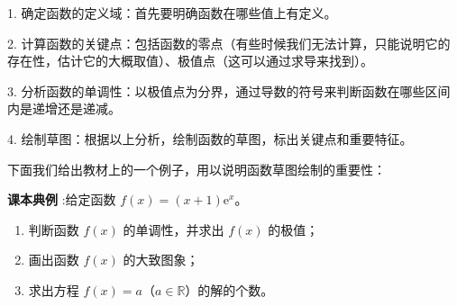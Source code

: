 \documentclass{article}
\begin{document}
1. 确定函数的定义域：首先要明确函数在哪些值上有定义。

2. 计算函数的关键点：包括函数的零点（有些时候我们无法计算，只能说明它的存在性，估计它的大概取值）、极值点（这可以通过求导来找到）。

3. 分析函数的单调性：以极值点为分界，通过导数的符号来判断函数在哪些区间内是递增还是递减。

4. 绘制草图：根据以上分析，绘制函数的草图，标出关键点和重要特征。

下面我们给出教材上的一个例子，用以说明函数草图绘制的重要性：
\vspace{2\baselineskip}
\newpage

\noindent \textbf{课本典例} :\;\;给定函数 \(f(x) = (x+1)\mathrm{e}^x\)。
\begin{enumerate}
    \item 判断函数 \(f(x)\) 的单调性，并求出 \(f(x)\) 的极值；
    \item 画出函数 \(f(x)\) 的大致图象；
    \item 求出方程 \(f(x) = a\)（\(a \in \mathbb{R}\)）的解的个数。
\end{enumerate}
\end{document}
